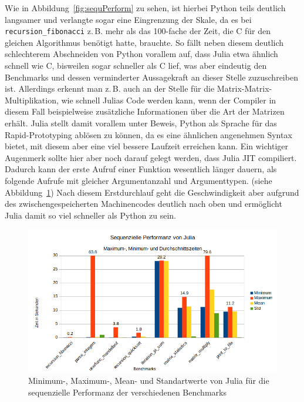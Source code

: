\documentclass[proseminar,german,utf8]{zihpub}
\newcommand{\zB}[0]{{z.\,B. }}
\begin{document}
Wie in Abbildung~\ref{fig:sequPerform} zu sehen, ist hierbei Python teils deutlich langsamer und verlangte sogar eine Eingrenzung der Skale, da es bei \verb|recursion_fibonacci| \zB mehr als das 100-fache der Zeit, die C für den gleichen Algorithmus benötigt hatte, brauchte. So fällt neben diesem deutlich schlechterem Abschneiden von Python vorallem auf, dass Julia etwa ähnlich schnell wie C,  bisweilen sogar schneller als C lief, was aber eindeutig den Benchmarks und dessen verminderter Aussagekraft an dieser Stelle zuzuschreiben ist. Allerdings erkennt man \zB auch an der Stelle für die Matrix-Matrix-Multiplikation, wie schnell Julias Code werden kann, wenn der Compiler in diesem Fall beispielweise zusätzliche Informationen über die Art der Matrizen erhält. Julia stellt damit vorallem unter Beweis, Python als Sprache für das Rapid-Prototyping ablösen zu können, da es eine ähnlichen angenehmen Syntax bietet, mit diesem aber eine viel bessere Laufzeit erreichen kann. Ein wichtiger Augenmerk sollte hier aber noch darauf gelegt werden, dass Julia JIT compiliert. Dadurch kann der erste Aufruf einer Funktion wesentlich länger dauern, als folgende Aufrufe mit gleicher Argumentanzahl und Argumenttypen. (siehe Abbildung~\ref{fig:juliaPerform}) Nach diesem Erstdurchlauf geht die Geschwindigkeit aber aufgrund des zwischengespeicherten Machinencodes deutlich nach oben und ermöglicht Julia damit so viel schneller als Python zu sein.

\begin{figure}[hbt!]
  \centering
  \includegraphics[scale=0.8]{bilder/julia_performance.png}
  \caption{Minimum-, Maximum-, Mean- und Standartwerte von Julia für die sequenzielle Performanz der verschiedenen Benchmarks }
  \label{fig:juliaPerform}
\end{figure}
\end{document}

